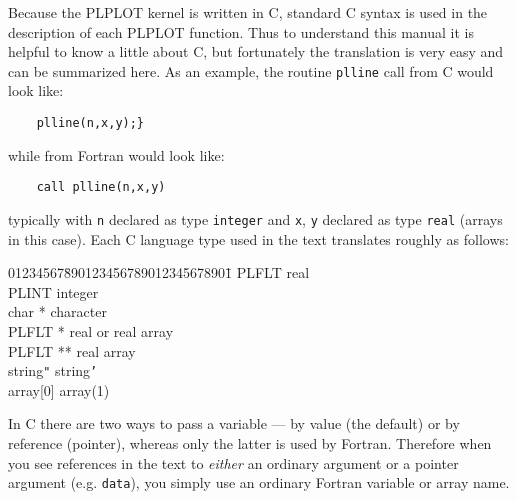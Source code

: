 Because the PLPLOT kernel is written in C, standard C syntax is used in the
description of each PLPLOT function.  Thus to understand this manual it is
helpful to know a little about C, but fortunately the translation is very
easy and can be summarized here.  As an example, the routine {\tt plline}
call from C would look like:
%
\begin{verbatim}
    plline(n,x,y);}
\end{verbatim}
%
while from Fortran would look like:
%
\begin{verbatim}
	call plline(n,x,y)
\end{verbatim}
%
typically with {\tt n} declared as type {\tt integer} and {\tt x}, {\tt y}
declared as type {\tt real} (arrays in this case).  Each C language type
used in the text translates roughly as follows:
\begin{tabbing}
01234567\=
	890123456789012345678901\=\kill
%
	\>PLFLT			\>real\\
	\>PLINT			\>integer\\
	\>char *		\>character\\
	\>PLFLT *		\>real or real array\\
	\>PLFLT **		\>real array\\
	string{\tt"}	string{\tt'}\\
	\>array[0]		\>array(1)\\
\end{tabbing}
In C there are two ways to pass a variable --- by value (the default) or by
reference (pointer), whereas only the latter is used by Fortran.
Therefore when you see references in the text to {\em either} an ordinary
argument or a pointer argument (e.g.  {\tt *data}), you simply use an
ordinary Fortran variable or array name.

